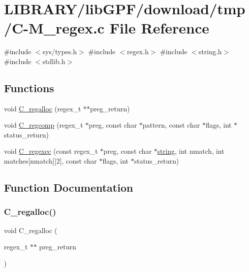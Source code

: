 \hypertarget{C-M__regex_8c}{}\section{L\+I\+B\+R\+A\+R\+Y/lib\+G\+P\+F/download/tmp/\+C-\/\+M\+\_\+regex.c File Reference}
\label{C-M__regex_8c}
{\ttfamily \#include $<$sys/types.\+h$>$}\newline
{\ttfamily \#include $<$regex.\+h$>$}\newline
{\ttfamily \#include $<$string.\+h$>$}\newline
{\ttfamily \#include $<$stdlib.\+h$>$}\newline
\subsection*{Functions}
\begin{DoxyCompactItemize}
\item 
void \hyperlink{C-M__regex_8c_a749eb5df717b312d898ea0a3b279e7ca}{C\+\_\+regalloc} (regex\+\_\+t $\ast$$\ast$preg\+\_\+return)
\item 
void \hyperlink{C-M__regex_8c_a3fcdbec663d5285a401e73c4cdca37be}{C\+\_\+regcomp} (regex\+\_\+t $\ast$preg, const char $\ast$pattern, const char $\ast$flags, int $\ast$status\+\_\+return)
\item 
void \hyperlink{C-M__regex_8c_ad4d383ae55d866605fb7ff11e8cf99d8}{C\+\_\+regexec} (const regex\+\_\+t $\ast$preg, const char $\ast$\hyperlink{what__overview_81_8txt_a7d189cc480786c3c65688ced463aedcb}{string}, int nmatch, int matches\mbox{[}nmatch\mbox{]}\mbox{[}2\mbox{]}, const char $\ast$flags, int $\ast$status\+\_\+return)
\end{DoxyCompactItemize}


\subsection{Function Documentation}
\mbox{\label{C-M__regex_8c_a749eb5df717b312d898ea0a3b279e7ca}} 
\subsubsection{\texorpdfstring{C\+\_\+regalloc()}{C\_regalloc()}}
{\footnotesize\ttfamily void C\+\_\+regalloc (\begin{DoxyParamCaption}\item[{regex\+\_\+t $\ast$$\ast$}]{preg\+\_\+return }\end{DoxyParamCaption})}

